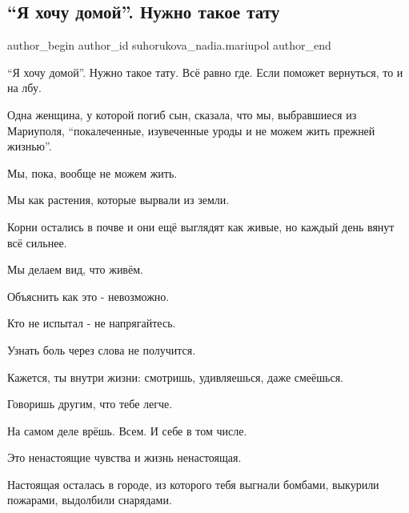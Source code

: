  
 
 
 
 

\subsection{\enquote{Я хочу домой}. Нужно такое тату}
\label{sec:10_02_2023.fb.suhorukova_nadia.mariupol.2._ya_khochu_domoi___n}

\ifcmt
 author_begin
   author_id suhorukova_nadia.mariupol
 author_end
\fi

\enquote{Я хочу домой}. Нужно  такое тату. Всё равно где. Если поможет вернуться, то и
на лбу. 

Одна  женщина, у которой погиб сын, сказала, что мы, выбравшиеся из Мариуполя,
\enquote{покалеченные, изувеченные уроды и не можем жить прежней жизнью}. 

Мы, пока, вообще не можем жить. 

Мы как растения, которые вырвали из земли. 

Корни остались в почве и они ещё выглядят как живые, но каждый день вянут всё
сильнее. 

Мы делаем вид, что живём. 

Объяснить как это  - невозможно. 

Кто не испытал - не напрягайтесь. 

Узнать боль через слова не получится. 

Кажется, ты внутри жизни: смотришь, удивляешься, даже смеёшься. 

Говоришь другим, что тебе легче.  

На самом деле врёшь. Всем. И  себе в том числе. 

Это ненастоящие чувства и жизнь ненастоящая. 

Настоящая осталась в городе, из которого тебя выгнали бомбами, выкурили
пожарами, выдолбили снарядами. 

